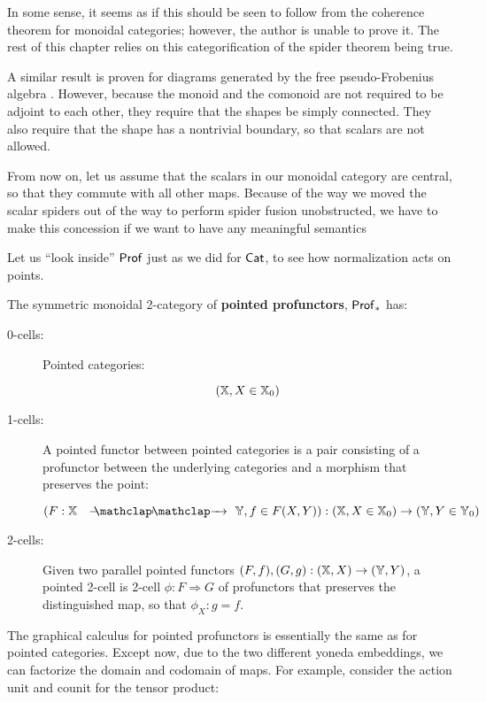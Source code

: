 In some sense, it seems as if this should be seen to follow from the coherence theorem for monoidal categories; however, the author is unable to prove it.
The rest of this chapter relies on this categorification of the spider theorem being true.  


A similar result is proven for diagrams generated by the free pseudo-Frobenius algebra \cite{dunn}.  However, because the monoid and the comonoid are not required to be adjoint to each other, they require that the shapes be simply connected.  They also require that the shape has a nontrivial boundary, so that scalars are not allowed.

From now on, let us assume that the scalars in our monoidal category are central, so that they commute with all other maps.  Because of the way we moved the scalar spiders out of the way to perform spider fusion unobstructed, we have to make this concession if we want to have any meaningful semantics

Let us ``look inside'' ${\sf Prof}$ just as we did for ${\sf Cat}$, to see how normalization acts on points.

\begin{definition}
The symmetric monoidal 2-category of {\bf pointed profunctors}, ${\sf Prof}_*$ has:

\begin{description}
\item[0-cells:] Pointed categories:

$$(\mathbb{X}, X\in\mathbb{X}_0)$$

\item[1-cells:] A pointed functor  between pointed categories is a pair consisting of a profunctor between the underlying categories and a morphism that preserves the point:

$$(F:\X\proarrow\Y, f\in F(X,Y)):(\X, X\in\X_0)\to (\Y, Y\in\Y_0)$$

\item[2-cells:] Given two parallel pointed functors $(F, f),  (G, g):(\mathbb{X}, X)\to (\mathbb{Y},Y)$,
a pointed 2-cell is 2-cell $\phi:F\Rightarrow G$ of profunctors that preserves the distinguished map, so that $\phi_X:g=f$.
\end{description}

\end{definition}


The graphical calculus for pointed profunctors is essentially the same as for pointed categories.  Except now, due to the two different yoneda embeddings, we can factorize the domain and codomain of maps.  For example, consider the action unit and counit for the tensor product:


